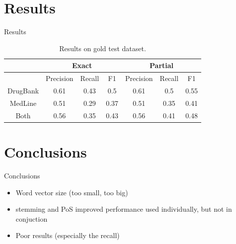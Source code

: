 \documentclass[11pt]{beamer}
\begin{document}
\section{Results}
\begin{frame}{Results}
\begin{table}
\begin{tabular}{c|ccc|ccc}
\toprule
& \multicolumn{3}{c}{Exact} & \multicolumn{3}{c}{Partial}\\
\midrule
& Precision & Recall & F1 & Precision & Recall & F1\\
\midrule
DrugBank & 0.61 &	0.43	& 0.5 & 0.61	& 0.5 &	0.55\\
MedLine & 0.51	& 0.29 & 0.37 & 0.51	& 0.35 &	0.41\\
Both& 0.56	& 0.35	& 0.43	& 0.56	& 0.41	& 0.48\\
\bottomrule
\end{tabular}
\caption{Results on gold test dataset.}
\end{table}
\end{frame}

\section{Conclusions}
\begin{frame}{Conclusions}
\begin{itemize}
\item Word vector size (too small, too big)
\item stemming and PoS improved performance used individually, but not in conjuction
\item Poor results (especially the recall)
\end{itemize}
\end{frame}
\end{document}
